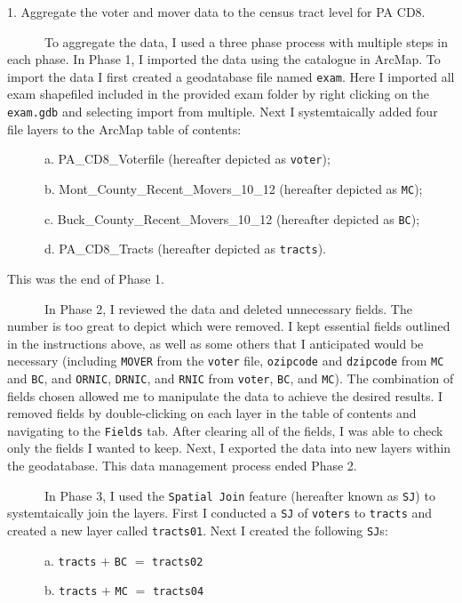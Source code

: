 \documentclass[]{article}
\begin{document}
1. Aggregate the voter and mover data to the census tract level for PA
CD8.

~~~~~~To aggregate the data, I used a three phase process with multiple
steps in each phase. In Phase 1, I imported the data using the catalogue
in ArcMap. To import the data I first created a geodatabase file named
\texttt{exam}. Here I imported all exam shapefiled included in the
provided exam folder by right clicking on the \texttt{exam.gdb} and
selecting import from multiple. Next I systemtaically added four file
layers to the ArcMap table of contents:

~~~~~~a. PA\_CD8\_Voterfile (hereafter depicted as \texttt{voter});

~~~~~~b. Mont\_County\_Recent\_Movers\_10\_12 (hereafter depicted as
\texttt{MC});

~~~~~~c. Buck\_County\_Recent\_Movers\_10\_12 (hereafter depicted as
\texttt{BC});

~~~~~~d. PA\_CD8\_Tracts (hereafter depicted as \texttt{tracts}).

This was the end of Phase 1.

~~~~~~In Phase 2, I reviewed the data and deleted unnecessary fields.
The number is too great to depict which were removed. I kept essential
fields outlined in the instructions above, as well as some others that I
anticipated would be necessary (including \texttt{MOVER} from the
\texttt{voter} file, \texttt{ozipcode} and \texttt{dzipcode} from
\texttt{MC} and \texttt{BC}, and \texttt{ORNIC}, \texttt{DRNIC}, and
\texttt{RNIC} from \texttt{voter}, \texttt{BC}, and \texttt{MC}). The
combination of fields chosen allowed me to manipulate the data to
achieve the desired results. I removed fields by double-clicking on each
layer in the table of contents and navigating to the \texttt{Fields}
tab. After clearing all of the fields, I was able to check only the
fields I wanted to keep. Next, I exported the data into new layers
within the geodatabase. This data management process ended Phase 2.

~~~~~~In Phase 3, I used the \texttt{Spatial\ Join} feature (hereafter
known as \texttt{SJ}) to systemtaically join the layers. First I
conducted a \texttt{SJ} of \texttt{voters} to \texttt{tracts} and
created a new layer called \texttt{tracts01}. Next I created the
following \texttt{SJ}s:

~~~~~~a. \texttt{tracts} \(+\) \texttt{BC} \(=\) \texttt{tracts02}

~~~~~~b. \texttt{tracts} \(+\) \texttt{MC} \(=\) \texttt{tracts04}
\end{document}
